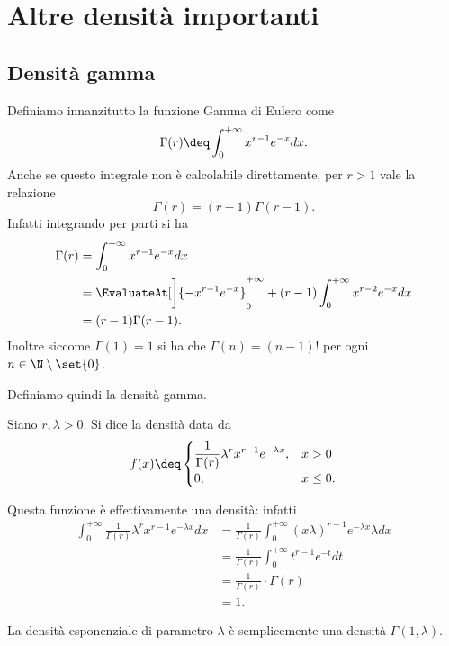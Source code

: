 \section{Altre densità importanti}

\subsection{Densità gamma}

Definiamo innanzitutto la funzione Gamma di Eulero come \[
    \Gamma(r) \deq \int_0^{+\infty} x^{r-1}e^{-x} dx.   
\] Anche se questo integrale non è calcolabile direttamente, per $r > 1$ vale la relazione \[
    \Gamma(r) = (r-1)\Gamma(r-1).
\] Infatti integrando per parti si ha \begin{align*}
    \Gamma(r) &= \int_0^{+\infty} x^{r-1}e^{-x} dx\\
    &= \EvaluateAt[\bigg]{-x^{r-1}e^{-x}}_0^{+\infty} + (r-1)\int_0^{+\infty} x^{r-2}e^{-x} dx\\
    &= (r-1)\Gamma(r-1).
\end{align*} Inoltre siccome $\Gamma(1) = 1$ si ha che $\Gamma(n) = (n-1)!$ per ogni $n \in \N \setminus \set{0}$.

Definiamo quindi la densità gamma.
\begin{definition}
     Siano $r, \lambda > 0$. Si dice  la densità data da \[
        f(x) \deq \begin{cases}
            \displaystyle \frac{1}{\Gamma(r)}\lambda^r x^{r-1} e^{-\lambda x}, &x > 0\\[2pt]
            0,                                                         &x \leq 0.
        \end{cases}    
    \]
\end{definition}
Questa funzione è effettivamente una densità: infatti \begin{align*}
    \int_0^{+\infty} \frac{1}{\Gamma(r)}\lambda^r x^{r-1} e^{-\lambda x} dx
    &= \frac{1}{\Gamma(r)} \int_0^{+\infty} (x\lambda)^{r-1} e^{-\lambda x} \lambda dx\\[2pt]
    &= \frac{1}{\Gamma(r)} \int_0^{+\infty} t^{r-1} e^{-t}dt\\[2pt]
    &= \frac{1}{\Gamma(r)} \cdot \Gamma(r)\\
    &= 1.
\end{align*}

\begin{remark}
    La densità esponenziale di parametro $\lambda$ è semplicemente una densità $\Gamma(1, \lambda)$.
\end{remark}

